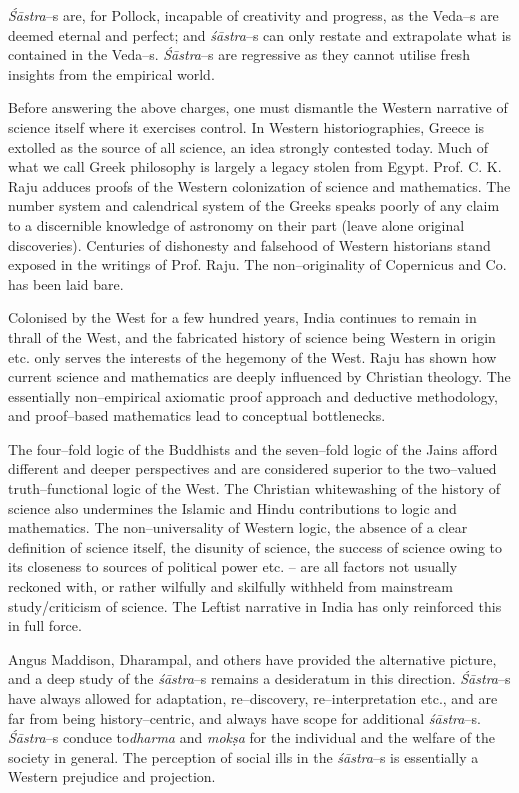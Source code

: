 \textit{Śāstra}–s are, for Pollock, incapable of creativity and progress, as the Veda–s are deemed eternal and perfect; and \textit{śāstra}–s can only restate and extrapolate what is contained in the Veda–s. \textit{Śāstra}–s are regressive as they cannot utilise fresh insights from the empirical world.

Before answering the above charges, one must dismantle the Western narrative of science itself where it exercises control. In Western historiographies, Greece is extolled as the source of all science, an idea strongly contested today. Much of what we call Greek philosophy is largely a legacy stolen from Egypt. Prof. C. K. Raju adduces proofs of the Western colonization of science and mathematics. The number system and calendrical system of the Greeks speaks poorly of any claim to a discernible knowledge of astronomy on their part (leave alone original discoveries). Centuries of dishonesty and falsehood of Western historians stand exposed in the writings of Prof. Raju. The non–originality of Copernicus and Co. has been laid bare. 

Colonised by the West for a few hundred years, India continues to remain in thrall of the West, and the fabricated history of science being Western in origin etc. only serves the interests of the hegemony of the West. Raju has shown how current science and mathematics are deeply influenced by Christian theology. The essentially non–empirical axiomatic proof approach and deductive methodology, and proof–based mathematics lead to conceptual bottlenecks.

The four–fold logic of the Buddhists and the seven–fold logic of the Jains afford different and deeper perspectives and are considered superior to the two–valued truth–functional logic of the West. The Christian whitewashing of the history of science also undermines the Islamic and Hindu contributions to logic and mathematics. The non–universality of Western logic, the absence of a clear definition of science itself, the disunity of science, the success of science owing to its closeness to sources of political power etc. – are all factors not usually reckoned with, or rather wilfully and skilfully withheld from mainstream study/criticism of science. The Leftist narrative in India has only reinforced this in full force.

Angus Maddison, Dharampal, and others have provided the alternative picture, and a deep study of the \textit{śāstra}–s remains a desideratum in this direction. \textit{Śāstra}–s have always allowed for adaptation, re–dis\-covery, re–interpretation etc., and are far from being history–centric, and always have scope for additional \textit{śāstra}–s. \textit{Śāstra}–s conduce to\break \textit{dharma} and \textit{mokṣa} for the individual and the welfare of the society in general. The perception of social ills in the \textit{śāstra}–s is essentially a Western prejudice and projection.

